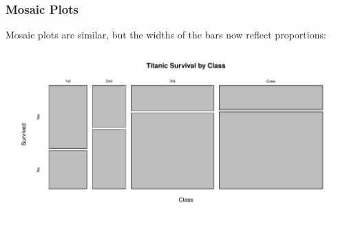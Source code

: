 \documentclass[handout]{beamer}
\newcommand{\blue}[1]{\textcolor{blue2}{#1}}
\begin{document}
%
%


\begin{frame}[fragile]
\frametitle{Mosaic Plots}
\blue{Mosaic plots} are similar, but the widths of the bars now reflect proportions:

\begin{center}
\includegraphics[width=\textwidth]{figure/mosaic_plot.pdf}
\end{center}

\end{frame}
\end{document}
